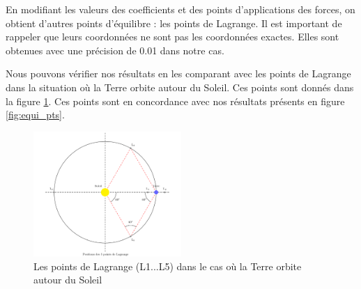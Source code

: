 En modifiant les valeurs des coefficients et des points d'applications des forces, on obtient d'autres points d'équilibre : les points de Lagrange. Il est important de rappeler que leurs coordonnées ne sont pas les coordonnées exactes. Elles sont obtenues avec une précision de 0.01 dans notre cas.

\bigskip

Nous pouvons vérifier nos résultats en les comparant avec les points de Lagrange dans la situation où la Terre orbite autour du Soleil. Ces points sont donnés dans la figure \ref{fig:lagr_pts}. Ces points sont en concordance avec nos résultats présents en figure \ref{fig:equi_pts}.\\

\begin{figure}[H]
  \centering
  \includegraphics[width=0.5\textwidth]{img/lagrangian_points.png}
  \caption{Les points de Lagrange (L1...L5) dans le cas où la Terre orbite autour du Soleil}
  \label{fig:lagr_pts}
\end{figure}
